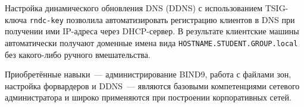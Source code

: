 \documentclass[a4paper,14pt,oneside,openany]{memoir}
\begin{document}
Настройка динамического обновления DNS (DDNS) с использованием TSIG-ключа \texttt{rndc-key} позволила автоматизировать регистрацию клиентов в DNS при получении ими IP-адреса через DHCP-сервер. В результате клиентские машины автоматически получают доменные имена вида \texttt{HOSTNAME.STUDENT.GROUP.local} без какого-либо ручного вмешательства.

Приобретённые навыки~--- администрирование BIND9, работа с файлами зон, настройка форвардеров и DDNS~--- являются базовыми компетенциями сетевого администратора и широко применяются при построении корпоративных сетей.

\printbibliography[title=Список использованных источников]
\end{document}
